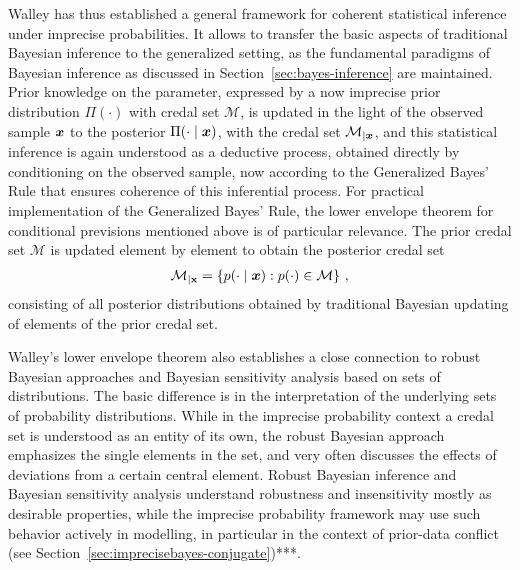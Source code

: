 Walley has thus established a general framework for coherent statistical inference under imprecise probabilities.
It allows to transfer the basic aspects of traditional Bayesian inference to the generalized setting,
as the fundamental paradigms of Bayesian inference as discussed in Section~\ref{sec:bayes-inference} are maintained.
Prior knowledge on the parameter, expressed by a now imprecise prior distribution $\Pi(\cdot)$ with credal set $\mathcal{M}$,
is updated in the light of the observed sample ${\bm x}$ to the posterior $\Pi(\cdot \mid {\bm x})$,
with the credal set $\mathcal{M}_{\vert {\bm x}}$,
and this statistical inference is again understood as a deductive process,
obtained directly by conditioning on the observed sample,
now according to the Generalized Bayes' Rule that ensures coherence of this inferential process.
For practical implementation of the Generalized Bayes' Rule, the lower envelope theorem for conditional 
previsions mentioned above %
is of particular relevance.
The prior credal set $\mathcal{M}$ is updated element by element to obtain the posterior credal set %
\begin{align*}
\mathcal{M}_{\vert \mathbf{x}} = \left\{ p(\cdot \mid {\bm x}) :  p(\cdot) \in \mathcal{M} \right\}\,,
\end{align*}
consisting of all posterior distributions obtained
by traditional Bayesian updating of elements of the prior credal set.

Walley's lower envelope theorem also establishes a close connection to robust Bayesian approaches and Bayesian sensitivity analysis
\parencite[see, e.g.,][]{2000:rios, 2005:ruggeri} based on sets of distributions.
The basic difference is in the interpretation of the underlying sets of probability distributions.
While in the imprecise probability context a credal set is understood as an entity of its own,
the robust Bayesian approach emphasizes the single elements in the set,
and very often discusses the effects of deviations from a certain central element.
Robust Bayesian inference and Bayesian sensitivity analysis
understand robustness and insensitivity mostly as desirable properties,
while the imprecise probability framework may use such behavior actively in modelling,
in particular in the context of prior-data conflict (see Section~\ref{sec:imprecisebayes-conjugate})***.


